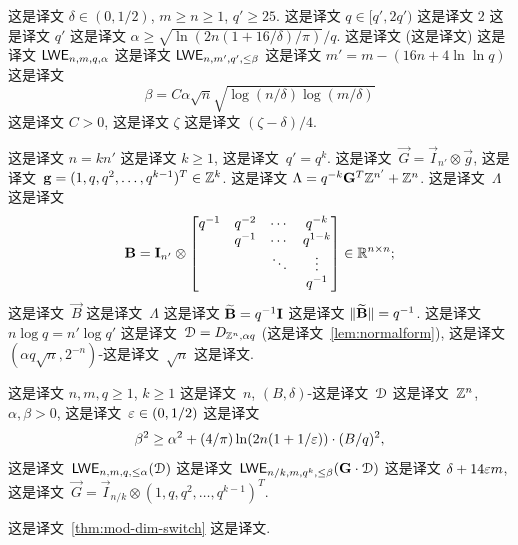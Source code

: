 \begin{corollary}
  \label{cor:mod-reduction-2}  这是译文 $\delta \in (0,1/2)$, $m \ge n \geq 1$, $q' \ge 25$. 这是译文 $q \in [q',2q')$ 这是译文 $2$ 这是译文 $q'$  这是译文 $\alpha \ge \sqrt{\ln(2n(1+16/\delta)/\pi)}/q$.  这是译文 (这是译文) 这是译文 $\mathsf{LWE}_{n,m,q, \alpha}$ 这是译文 $\mathsf{LWE}_{n,m',q', \le \beta}$  这是译文 $m'=m-(16 n + 4 \ln\ln q)$ 这是译文  \[
	\beta = C \alpha \sqrt{n} \sqrt{\log(n/\delta)\log(m/\delta)}
	\]  这是译文 $C>0$, 这是译文 $\zeta$ 这是译文 $(\zeta-\delta)/4$.
\end{corollary}


  这是译文  $n=kn'$ 这是译文 $k \ge 1$, 这是译文~$q' = q^{k}$.  这是译文~$\vec{G} =
  \vec{I}_{n'} \otimes \vec{g}$, 这是译文~$\mathbf{g} = (1,q,q^2, \ldots,
  q^{k-1})^T \in \mathbb{Z}^k$.  这是译文 $\Lambda = q^{-k} \mathbf{G}^T
  \mathbb{Z}^{n'} + \mathbb{Z}^n$.  这是译文~$\Lambda$ 这是译文 \[
\mathbf{B}= \mathbf{I}_{n'} \otimes 
\begin{bmatrix}
q^{-1} & q^{-2} & \cdots & q^{-k} \\
       & q^{-1} & \cdots & q^{1-k} \\
       &        & \ddots & \vdots \\
       &		&		 & q^{-1}
     \end{bmatrix} \in \mathbb{R}^{n \times n};
\] 这是译文~$\vec{B}$ 这是译文~$\Lambda$ 这是译文 $\widetilde{\mathbf{B}} = q^{-1} \mathbf{I}$ 这是译文 $\lVert\widetilde{\mathbf{B}}\rVert=q^{-1}$.  这是译文~$n \log q = n' \log q'$ 这是译文~$\mathcal{D} = D_{\mathbb{Z}^{n}, \alpha q}$ (这是译文~\ref{lem:normalform}), 这是译文 $(\alpha q
\sqrt{n}, 2^{-n})$-这是译文~$\sqrt{n}$ 这是译文. 

\begin{corollary}
  \label{cor:mod-dim-tradeoff}  这是译文 $n, m,q \ge 1$, $k \ge 1$ 这是译文~$n$,  $(B,\delta)$-这是译文~$\mathcal{D}$ 这是译文~$\mathbb{Z}^{n}$,  $\alpha,\beta>0$, 这是译文~$\varepsilon \in (0,1/2)$ 这是译文 \[
\beta^{2} \geq \alpha^{2} + (4/\pi)
  \ln(2n(1+1/\varepsilon)) \cdot (B/q)^{2},
\]  这是译文~$\mathsf{LWE}_{n,m,q,\le \alpha}(\mathcal{D})$  这是译文~$\mathsf{LWE}_{n/k,m,q^k,\le \beta}(\mathbf{G} \cdot \mathcal{D})$ 这是译文 $\delta+14 \varepsilon m$,  这是译文~$\vec{G} = \vec{I}_{n/k} \otimes  (1,q,q^2, \ldots, q^{k-1})^T$.
\end{corollary}

\noindent 这是译文~\ref{thm:mod-dim-switch} 这是译文.


